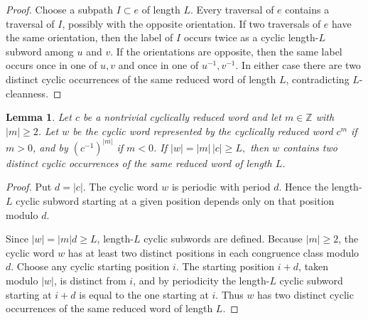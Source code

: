 \documentclass{amsproc}
\newtheorem{lemma}[theorem]{Lemma}
\begin{document}
\begin{proof}
Choose a subpath $I\subset e$ of length $L$.  Every traversal of $e$ contains a
traversal of $I$, possibly with the opposite orientation.  If two traversals of
$e$ have the
same orientation, then the label of $I$ occurs twice as a cyclic length-$L$
subword among $u$ and $v$.  If the orientations are opposite, then the same
label occurs once in one of $u,v$ and once in one of $u^{-1},v^{-1}$.  In either
case there are two distinct cyclic occurrences of the same reduced word of
length $L$, contradicting $L$-cleanness.
\end{proof}

\begin{lemma}\label{lem:rank-one-periodicity}
Let \(c\) be a nontrivial cyclically reduced word and let \(m\in\mathbb Z\) with
\(|m|\geq 2\).  Let \(w\) be the cyclic word represented by the cyclically
reduced word \(c^m\) if \(m>0\), and by \((c^{-1})^{|m|}\) if \(m<0\).  If
$
        |w|=|m|\,|c|\geq L,
$
then \(w\) contains two distinct cyclic occurrences of the same reduced word of
length \(L\).
\end{lemma}

\begin{proof}
Put \(d=|c|\).  The cyclic word \(w\) is periodic with period \(d\).  Hence the
length-\(L\) cyclic subword starting at a given position depends only on that
position modulo \(d\).

Since \(|w|=|m|d\geq L\), length-\(L\) cyclic subwords are defined.  Because
\(|m|\geq 2\), the cyclic word \(w\) has at least two distinct positions in each
congruence class modulo \(d\).  Choose any cyclic starting position \(i\).  The
starting position \(i+d\), taken modulo \(|w|\), is distinct from \(i\), and by
periodicity the length-\(L\) cyclic subword starting at \(i+d\) is equal to the
one starting at \(i\).  Thus \(w\) has two distinct cyclic occurrences of the
same reduced word of length \(L\).
\end{proof}
\end{document}
